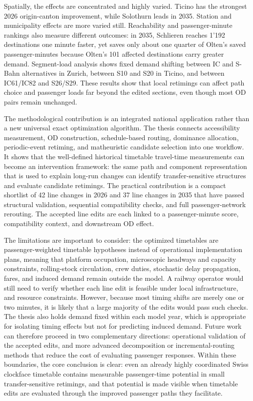 \documentclass[10pt,a4paper]{article}
\begin{document}
Spatially, the effects are concentrated and highly varied. Ticino has the strongest 2026 origin-canton improvement, while Solothurn leads in 2035. Station and municipality effects are more varied still. Reachability and passenger-minute rankings also measure different outcomes: in 2035, Schlieren reaches 1'192 destinations one minute faster, yet saves only about one quarter of Olten's saved passenger-minutes because Olten's 101 affected destinations carry greater demand. Segment-load analysis shows fixed demand shifting between IC and S-Bahn alternatives in Zurich, between S10 and S20 in Ticino, and between IC61/IC82 and S26/S29. These results show that local retimings can affect path choice and passenger loads far beyond the edited sections, even though most OD pairs remain unchanged.

The methodological contribution is an integrated national application rather than a new universal exact optimization algorithm. The thesis connects accessibility measurement, OD construction, schedule-based routing, dominance allocation, periodic-event retiming, and matheuristic candidate selection into one workflow. It shows that the well-defined historical timetable travel-time measurements can become an intervention framework: the same path and component representation that is used to explain long-run changes can identify transfer-sensitive structures and evaluate candidate retimings. The practical contribution is a compact shortlist of 42 line changes in 2026 and 37 line changes in 2035 that have passed structural validation, sequential compatibility checks, and full passenger-network rerouting. The accepted line edits are each linked to a passenger-minute score, compatibility context, and downstream OD effect.

The limitations are important to consider: the optimized timetables are passenger-weighted timetable hypotheses instead of operational implementation plans, meaning that platform occupation, microscopic headways and capacity constraints, rolling-stock circulation, crew duties, stochastic delay propagation, fares, and induced demand remain outside the model. A railway operator would still need to verify whether each line edit is feasible under local infrastructure, and resource constraints. However, because most timing shifts are merely one or two minutes, it is likely that a large majority of the edits would pass such checks. The thesis also holds demand fixed within each model year, which is appropriate for isolating timing effects but not for predicting induced demand. Future work can therefore proceed in two complementary directions: operational validation of the accepted edits, and more advanced decomposition or incremental-routing methods that reduce the cost of evaluating passenger responses. Within these boundaries, the core conclusion is clear: even an already highly coordinated Swiss clockface timetable contains measurable passenger-time potential in small transfer-sensitive retimings, and that potential is made visible when timetable edits are evaluated through the improved passenger paths they facilitate.

\clearpage


\end{document}
